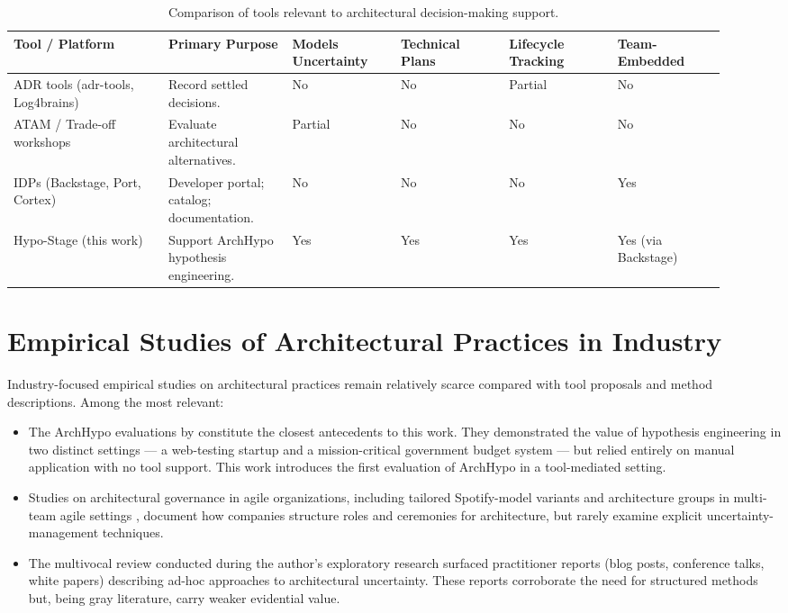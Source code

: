 \begin{table}[htbp]
\centering
\caption{Comparison of tools relevant to architectural decision-making support.}
\label{tab:tools-comparison}
\begin{tabular}{p{0.20\linewidth} p{0.16\linewidth} p{0.14\linewidth} p{0.14\linewidth} p{0.14\linewidth} p{0.14\linewidth}}
\toprule
\textbf{Tool / Platform} & \textbf{Primary Purpose} & \textbf{Models Uncertainty} & \textbf{Technical Plans} & \textbf{Lifecycle Tracking} & \textbf{Team-Embedded} \\
\midrule
ADR tools (adr-tools, Log4brains) & Record settled decisions. & No & No & Partial & No \\
\midrule
ATAM / Trade-off workshops & Evaluate architectural alternatives. & Partial & No & No & No \\
\midrule
IDPs (Backstage, Port, Cortex) & Developer portal; catalog; documentation. & No & No & No & Yes \\
\midrule
Hypo-Stage (this work) & Support ArchHypo hypothesis engineering. & Yes & Yes & Yes & Yes (via Backstage) \\
\bottomrule
\end{tabular}
\end{table}

\section{Empirical Studies of Architectural Practices in Industry}
\label{sec:empirical-studies}

Industry-focused empirical studies on architectural practices remain relatively scarce
compared with tool proposals and method descriptions. Among the most relevant:

\begin{itemize}
  \item The ArchHypo evaluations by \citet{silva2024tse,silva2024ieeesw}
  constitute the closest antecedents to this work. They demonstrated the value of
  hypothesis engineering in two distinct settings --- a web-testing startup and a
  mission-critical government budget system --- but relied entirely on manual application
  with no tool support. This work introduces the first evaluation of ArchHypo in a
  tool-mediated setting.

  \item Studies on architectural governance in agile organizations, including
  tailored Spotify-model variants \citep{salameh2021architecture} and architecture
  groups in multi-team agile settings \citep{deDiana2011arch}, document how
  companies structure roles and ceremonies for architecture, but rarely examine
  explicit uncertainty-management techniques.

  \item The multivocal review conducted during the author's exploratory research surfaced
  practitioner reports (blog posts, conference talks, white papers) describing ad-hoc
  approaches to architectural uncertainty. These reports corroborate the need for
  structured methods but, being gray literature, carry weaker evidential value.
\end{itemize}

